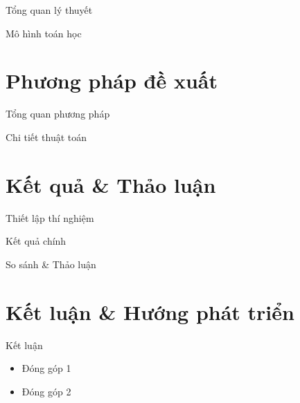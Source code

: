 \documentclass[aspectratio=169]{beamer}
\begin{document}
\begin{frame}{Tổng quan lý thuyết}
\end{frame}

\begin{frame}{Mô hình toán học}
\end{frame}

\section{Phương pháp đề xuất}

\begin{frame}{Tổng quan phương pháp}
\end{frame}

\begin{frame}{Chi tiết thuật toán}
\end{frame}

\section{Kết quả \& Thảo luận}

\begin{frame}{Thiết lập thí nghiệm}
\end{frame}

\begin{frame}{Kết quả chính}
\end{frame}

\begin{frame}{So sánh \& Thảo luận}
\end{frame}

\section{Kết luận \& Hướng phát triển}

\begin{frame}{Kết luận}
  \begin{itemize}
    \item Đóng góp 1
    \item Đóng góp 2
  \end{itemize}
\end{frame}
\end{document}
